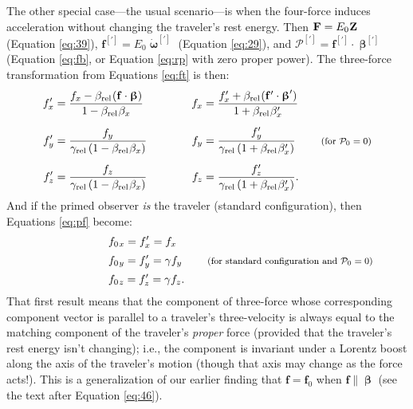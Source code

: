 \documentclass[12pt]{article}
\renewcommand{\vv}[1]{\mathbf{#1}}
\newcommand{\vvbeta}{\bm{\upbeta}}
\newcommand{\vvomega}{\bm{\upomega}}
\begin{document}
The other special case---the usual scenario---is when the four-force induces acceleration without changing the traveler's rest energy. Then $\vv F = E_0 \mkern.5mu \vv Z$ (Equation \ref{eq:39}), $\vv f^{[\prime]} = E_0 \dot{\vvomega}^{[\prime]}$ (Equation \ref{eq:29}), and $\mathcal{P}^{[\prime]} = \vv f^{[\prime]} \cdot \vvbeta^{[\prime]}$ (Equation \ref{eq:fb}, or Equation \ref{eq:rp} with zero proper power). The three-force transformation from Equations \ref{eq:ft} is then:
\begin{equation*}
\begin{aligned}
f_x^\prime &= \dfrac{f_x - \beta_{\textrm{rel}} \mkern1mu ( \vv f \cdot \vvbeta ) }{1 - \beta_{\textrm{rel}} \mkern1mu \beta_x} & f_x &= \dfrac{ f^\prime_x + \beta_{\textrm{rel}} \mkern1mu ( \vv f^\prime \cdot \vvbeta^\prime ) }{1 + \beta_{\textrm{rel}} \mkern1mu \beta^\prime_x} \\[5pt]
f_y^\prime &= \dfrac{f_y}{\gamma_{\textrm{rel}} \left( 1 - \beta_{\textrm{rel}} \mkern1mu \beta_x \right) } \qquad \quad & f_y &= \dfrac{f^\prime_y}{\gamma_{\textrm{rel}} \left( 1 + \beta_{\textrm{rel}} \mkern1mu \beta^\prime_x \right) } \qquad \textrm{\footnotesize{ (for $\mathcal{P}_0 = 0$)}} \\[5pt]
f_z^\prime &= \dfrac{f_z}{\gamma_{\textrm{rel}} \left( 1 - \beta_{\textrm{rel}} \mkern1mu \beta_x \right) } & f_z &= \dfrac{f^\prime_z}{\gamma_{\textrm{rel}} \left( 1 + \beta_{\textrm{rel}} \mkern1mu \beta^\prime_x \right) } .
\end{aligned}
\end{equation*}
And if the primed observer \emph{is} the traveler (standard configuration), then Equations \ref{eq:pf} become:
\begin{equation*}
\begin{aligned}
\qquad \qquad \qquad & f_{0 \mkern1.5mu x} = f_x^\prime = f_x \\[2pt]
& f_{0 \mkern1.5mu y} = f_y^\prime = \gamma f_y \qquad \textrm{\footnotesize{ (for standard configuration and $\mathcal{P}_0 = 0$)}} \\[2pt]
& f_{0 \mkern1.5mu z} = f_z^\prime = \gamma f_z .
\end{aligned}
\end{equation*}
That first result means that the component of three-force whose corresponding component vector is parallel to a traveler's three-velocity is always equal to the matching component of the traveler's \emph{proper} force (provided that the traveler's rest energy isn't changing); i.e., the component is invariant under a Lorentz boost along the axis of the traveler's motion (though that axis may change as the force acts!). This is a generalization of our earlier finding that $\vv f = \vv f_0$ when $\vv f \parallel \vvbeta$ (see the text after Equation \ref{eq:46}).
\end{document}
